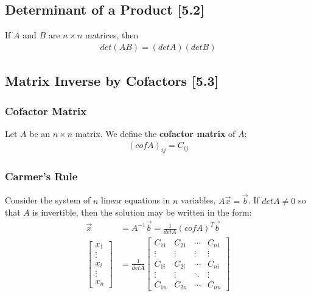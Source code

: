 \documentclass[a4paper,9pt]{extarticle}
\begin{document}
\begin{multicols*}{2}
\subsection{Determinant of a Product [5.2]}
If $A$ and $B$ are $n \times n$ matrices, then
\begin{equation} \label{5.2-1}
    \begin{split}
        det(AB) = (det A)(det B)
    \end{split}
\end{equation}


\subsection{Matrix Inverse by Cofactors [5.3]}


\subsubsection{Cofactor Matrix}
Let $A$ be an $n \times n$ matrix. We define the \textbf{cofactor matrix} of $A$:
\begin{equation} \label{5.3-1}
    \begin{split}
        (cof A)_{ij} = C_{ij}
    \end{split}
\end{equation}


\subsubsection{Carmer's Rule}
Consider the system of $n$ linear equations in $n$ variables, $A \vec{x} = \vec{b}$. If $det A \neq 0$ so that $A$ is invertible, then the solution may be written in the form:
\begin{equation} \label{5.3-2}
    \begin{split}
        \vec{x} & = A^{-1} \vec{b} = \frac{1}{det A} (cof A)^T \vec{b} \\
        \begin{bmatrix}x_1 \\ \vdots \\ x_i \\ \vdots \\ x_n \end{bmatrix} & = \frac{1}{det A} \begin{bmatrix}C_{11} & C_{21} & \cdots & C_{n1} \\ \vdots & \vdots & \vdots & \vdots \\ C_{1i} & C_{2i} & \cdots & C_{ni} \\ \vdots & \vdots & \ddots & \vdots \\ C_{1n} & C_{2n} & \cdots  &C_{nn} \end{bmatrix}
    \end{split}
\end{equation}


\end{multicols*}
\end{document}
